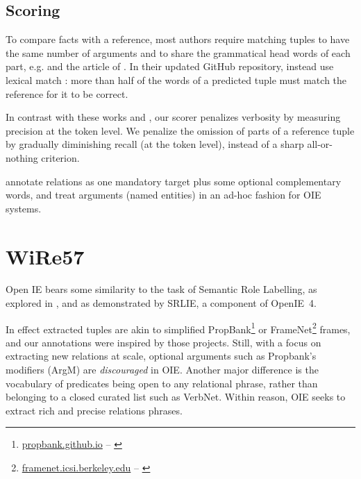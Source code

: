 \pdfoutput=1 \documentclass[11pt, a4paper]{article}
\begin{document}
\subsection{Scoring}
\label{sec:orgdb42d39}
To compare facts with a reference, most authors require matching tuples to
have the same number of arguments and to share the grammatical head words
of each part, e.g. \citet{DBLP:conf/conll/AngeliM13} and the article
of \citet{Stanovsky2016EMNLP}. In their updated GitHub repository, \citet{Stanovsky2016EMNLP} instead use lexical match : more than half
of the words of a predicted tuple must match the reference for it to be correct. 

In contrast with these works and \cite{W17-5402}, our scorer penalizes
verbosity by measuring precision at the token level. We penalize the
omission of parts of a reference tuple by gradually diminishing recall (at
the token level), instead of a sharp all-or-nothing criterion.

\citet{mesquita-schmidek-barbosa:2013:EMNLP} annotate relations as one
mandatory target plus some optional complementary words, and treat
arguments (named entities) in an ad-hoc fashion for OIE systems.


\section{WiRe57}
\label{sec:orgdb6a137}
Open IE bears some similarity to the task of Semantic Role Labelling, as
explored in \cite{Christensen:2011:AOI:1999676.1999697,mesquita-schmidek-barbosa:2013:EMNLP}, and as demonstrated by SRLIE, a
component of OpenIE~4. 

In effect extracted tuples are akin to simplified PropBank\footnote{\url{propbank.github.io} -- \citep{Kingsbury02fromtreebank}} or FrameNet\footnote{\url{framenet.icsi.berkeley.edu} -- \citep{framenet}} frames, and our annotations were inspired by those
projects. Still, with a focus on extracting new relations at scale, optional
arguments such as Propbank's modifiers (ArgM) are \emph{discouraged} in
OIE. Another major difference is the vocabulary of predicates being open to
any relational phrase, rather than belonging to a closed curated list such
as VerbNet. Within reason, OIE seeks to extract rich and precise relations
phrases. 
\end{document}
